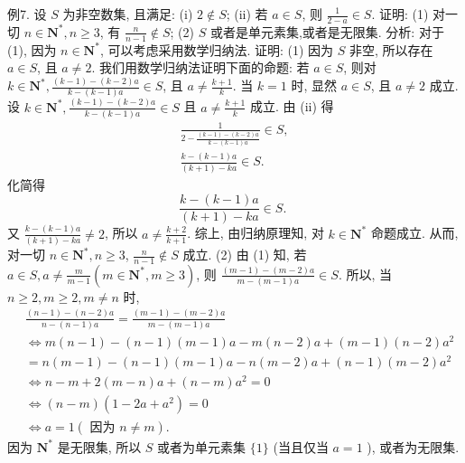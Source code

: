 例7. 设 $S$ 为非空数集, 且满足: (i) $2 \notin S$; (ii) 若 $a \in S$, 则 $\frac{1}{2-a} \in S$. 证明:
(1) 对一切 $n \in \mathbf{N}^*, n \geqslant 3$, 有 $\frac{n}{n-1} \notin S$;
(2) $S$ 或者是单元素集,或者是无限集.
分析: 对于 (1), 因为 $n \in \mathbf{N}^*$, 可以考虑采用数学归纳法.
证明: (1) 因为 $S$ 非空, 所以存在 $a \in S$, 且 $a \neq 2$.
我们用数学归纳法证明下面的命题:
若 $a \in S$, 则对 $k \in \mathbf{N}^*, \frac{(k-1)-(k-2) a}{k-(k-1) a} \in S$, 且 $a \neq \frac{k+1}{k}$.
当 $k=1$ 时, 显然 $a \in S$, 且 $a \neq 2$ 成立.
设 $k \in \mathbf{N}^*, \frac{(k-1)-(k-2) a}{k-(k-1) a} \in S$ 且 $a \neq \frac{k+1}{k}$ 成立.
由 (ii) 得
$$
\begin{gathered}
\frac{1}{2-\frac{(k-1)-(k-2) a}{k-(k-1) a}} \in S, \\
\frac{k-(k-1) a}{(k+1)-k a} \in S .
\end{gathered}
$$
化简得
$$
\frac{k-(k-1) a}{(k+1)-k a} \in S \text {. }
$$
又 $\frac{k-(k-1) a}{(k+1)-k a} \neq 2$, 所以 $a \neq \frac{k+2}{k+1}$.
综上, 由归纳原理知, 对 $k \in \mathbf{N}^*$ 命题成立.
从而, 对一切 $n \in \mathbf{N}^*, n \geqslant 3$, $\frac{n}{n-1} \notin S$ 成立.
(2) 由 (1) 知, 若 $a \in S, a \neq \frac{m}{m-1}\left(m \in \mathbf{N}^*, m \geqslant 3\right)$, 则 $\frac{(m-1)-(m-2) a}{m-(m-1) a} \in S$.
所以, 当 $n \geqslant 2, m \geqslant 2, m \neq n$ 时,
$$
\begin{aligned}
& \frac{(n-1)-(n-2) a}{n-(n-1) a}=\frac{(m-1)-(m-2) a}{m-(m-1) a} \\
& \Leftrightarrow m(n-1)-(n-1)(m-1) a-m(n-2) a+(m-1)(n-2) a^2 \\
& =n(m-1)-(n-1)(m-1) a-n(m-2) a+(n-1)(m-2) a^2 \\
& \Leftrightarrow n-m+2(m-n) a+(n-m) a^2=0 \\
& \Leftrightarrow(n-m)\left(1-2 a+a^2\right)=0 \\
& \Leftrightarrow a=1 (\text { 因为 } n \neq m) .
\end{aligned}
$$
因为 $\mathbf{N}^*$ 是无限集, 所以 $S$ 或者为单元素集 $\{1\}$ (当且仅当 $a=1$ ), 或者为无限集.



